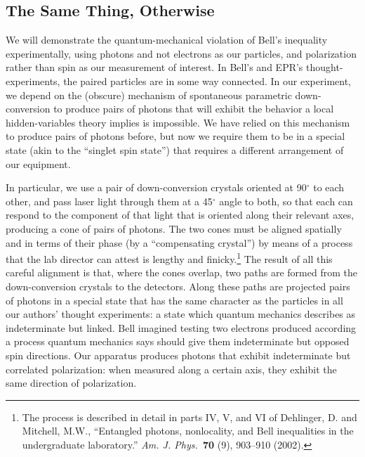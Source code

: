 \subsection*{The Same Thing, Otherwise}

We will demonstrate the quantum-mechanical violation of Bell's inequality experimentally, using
photons and not electrons as our particles, and polarization rather than spin as our measurement 
of interest. In Bell's and EPR's thought-experiments, the paired particles are in some way connected. 
In our experiment, we depend on the (obscure) mechanism of spontaneous parametric down-conversion to produce
pairs of photons that will exhibit the behavior a local hidden-variables theory implies is impossible. We have relied on this mechanism to produce pairs of photons before, but now we require them to be in a special state (akin to the ``singlet spin state'') that requires a different arrangement of our equipment.

In particular, we use a pair of down-conversion crystals oriented at 90$^{\circ}$ to each other, and pass laser light through them at a 45$^{\circ}$ angle to both, so that each can respond to the component of that light that is oriented along their relevant axes, producing a cone of pairs of photons. The two cones must be aligned spatially and in terms of their phase (by a ``compensating crystal'') by means of a process that the lab director can attest is lengthy and finicky.\footnote{The process is described in detail in parts IV, V, and VI of Dehlinger, D. and Mitchell, M.W., ``Entangled photons, nonlocality, and Bell inequalities in the undergraduate laboratory.'' \emph{Am. J. Phys.\ }\textbf{70} (9), 903--910 (2002).} The result of all this careful alignment is that, where the cones overlap, two paths are formed from the down-conversion crystals to the detectors. Along these paths are projected pairs of photons in a special state that has the same character as the particles in all our authors' thought experiments: a state which quantum mechanics describes as indeterminate but linked. Bell imagined testing two electrons produced according a process quantum mechanics says should give them indeterminate but opposed spin directions. Our apparatus produces photons that exhibit indeterminate but correlated polarization: when measured along a certain axis, they exhibit the same direction of polarization.


